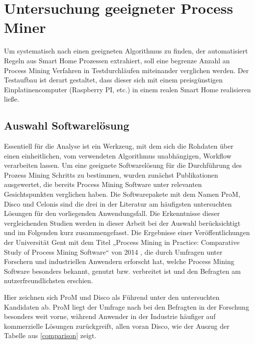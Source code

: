 \chapter{Untersuchung geeigneter Process Miner}\label{chap:approach}
Um systematisch nach einen geeigneten Algorithmus zu finden, der automatisiert Regeln aus Smart Home Prozessen extrahiert, soll eine begrenze Anzahl an Process Mining Verfahren in Testdurchläufen miteinander verglichen werden. Der Testaufbau ist derart gestaltet, dass dieser sich mit einem preisgünstigen Einplatinencomputer (Raspberry PI, etc.) in einem realen Smart Home realisieren ließe. 

\section{Auswahl Softwarelösung}
Essentiell für die Analyse ist ein Werkzeug, mit dem sich die Rohdaten über einen einheitlichen, vom verwendeten Algorithmus unabhängigen, Workflow verarbeiten lassen. Um eine geeignete Softwarelösung für die Durchführung des Prozess Mining Schritts zu bestimmen, wurden zunächst Publikationen ausgewertet, die bereits Process Mining Software unter relevanten Gesichtspunkten verglichen haben. 
Die Softwarepakete mit dem Namen ProM, Disco und Celonis sind die drei in der Literatur am häufigsten untersuchten Lösungen für den vorliegenden Anwendungsfall. Die Erkenntnisse dieser vergleichenden Studien werden in dieser Arbeit bei der Auswahl berücksichtigt und im Folgenden kurz zusammengefasst. 
Die Ergebnisse einer Veröffentlichungen der Universität Gent mit dem Titel „Process Mining in Practice: Comparative Study of Process Mining Software“ von 2014 \cite{compPM}, die durch Umfragen unter Forschern und industriellen Anwendern erforscht hat, welche Process Mining Software besonders bekannt, genutzt bzw. verbreitet ist und den Befragten am nutzerfreundlichsten erschien.

Hier zeichnen sich ProM und Disco als Führend unter den untersuchten Kandidaten ab. ProM liegt der Umfrage nach bei den Befragten in der Forschung besonders weit vorne, während Anwender in der Industrie häufiger auf kommerzielle Lösungen zurückgreift, allen voran Disco, wie der Auszug der Tabelle aus \ref{comparison} zeigt.

\begin{table}[!h]
\centering
{}
\caption{Auszug aus Tabelle 5 aus "Process Mining in Practice" \cite{compPM} }
\label{comparison}
\end{table}

